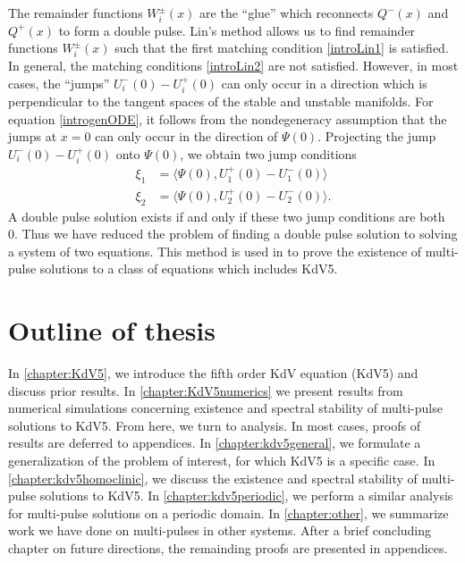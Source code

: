 \documentclass[thesis.tex]{subfiles}
\begin{document}
The remainder functions $W_i^\pm(x)$ are the ``glue'' which reconnects $Q^-(x)$ and $Q^+(x)$ to form a double pulse. Lin's method allows us to find remainder functions $W_i^\pm(x)$ such that the first matching condition \cref{introLin1} is satisfied. In general, the matching conditions \cref{introLin2} are not satisfied. However, in most cases, the ``jumps'' $U_i^-(0) - U_i^+(0)$ can only occur in a direction which is perpendicular to the tangent spaces of the stable and unstable manifolds. For equation \cref{introgenODE}, it follows from the nondegeneracy assumption that the jumps at $x = 0$ can only occur in the direction of $\Psi(0)$. Projecting the jump $U_i^-(0) - U_i^+(0)$ onto $\Psi(0)$, we obtain two jump conditions
\begin{equation}\label{introLinJump}
\begin{aligned}
\xi_1 &= \langle \Psi(0), U_1^+(0) - U_1^-(0) \rangle \\
\xi_2 &= \langle \Psi(0), U_2^+(0) - U_2^-(0) \rangle.
\end{aligned}
\end{equation} 
A double pulse solution exists if and only if these two jump conditions are both 0. Thus we have reduced the problem of finding a double pulse solution to solving a system of two equations. This method is used in \cite{SandstedeStrut} to prove the existence of multi-pulse solutions to a class of equations which includes KdV5. 

\section{Outline of thesis}

In \cref{chapter:KdV5}, we introduce the fifth order KdV equation (KdV5) and discuss prior results. In \cref{chapter:KdV5numerics} we present results from numerical simulations concerning existence and spectral stability of multi-pulse solutions to KdV5. From here, we turn to analysis. In most cases, proofs of results are deferred to appendices. In \cref{chapter:kdv5general}, we formulate a generalization of the problem of interest, for which KdV5 is a specific case. In \cref{chapter:kdv5homoclinic}, we discuss the existence and spectral stability of multi-pulse solutions to KdV5. In \cref{chapter:kdv5periodic}, we perform a similar analysis for multi-pulse solutions on a periodic domain. In \cref{chapter:other}, we summarize work we have done on multi-pulses in other systems. After a brief concluding chapter on future directions, the remainding proofs are presented in appendices.

\iffulldocument\else
	
	
\fi
\end{document}
